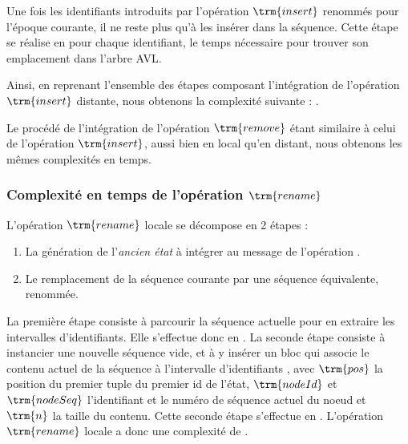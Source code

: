 Une fois les identifiants introduits par l'opération $\trm{insert}$ renommés pour l'époque courante, il ne reste plus qu'à les insérer dans la séquence.
Cette étape se réalise en  pour chaque identifiant, le temps nécessaire pour trouver son emplacement dans l'arbre AVL.

Ainsi, en reprenant l'ensemble des étapes composant l'intégration de l'opération $\trm{insert}$ distante, nous obtenons la complexité suivante : .

Le procédé de l'intégration de l'opération $\trm{remove}$ étant similaire à celui de l'opération $\trm{insert}$, aussi bien en local qu'en distant, nous obtenons les mêmes complexités en temps.

\subsubsection{Complexité en temps de l'opération $\trm{rename}$}
\label{sec:validation-time-complexity-rename}

L'opération $\trm{rename}$ locale se décompose en 2 étapes :
\begin{enumerate}
  \item La génération de l'\emph{ancien état} à intégrer au message de l'opération .
  \item Le remplacement de la séquence courante par une séquence équivalente, renommée.
\end{enumerate}
La première étape consiste à parcourir la séquence actuelle pour en extraire les intervalles d'identifiants.
Elle s'effectue donc en .
La seconde étape consiste à instancier une nouvelle séquence vide, et à y insérer un bloc qui associe le contenu actuel de la séquence à l'intervalle d'identifiants , avec $\trm{pos}$ la position du premier tuple du premier id de l'état, $\trm{nodeId}$ et $\trm{nodeSeq}$ l'identifiant et le numéro de séquence actuel du noeud et $\trm{n}$ la taille du contenu.
Cette seconde étape s'effectue en .
L'opération $\trm{rename}$ locale a donc une complexité de .

